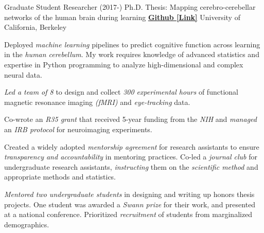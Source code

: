 

\begin{cventries}

  \cventry
    {Graduate Student Researcher (2017-)} %
    {Ph.D. Thesis: Mapping cerebro-cerebellar networks of the human brain during learning}
    {\href{https://github.com/maedbhk/cerebellum_learning_connect}{\textbf{Github [Link]}}}
    {University of California, Berkeley} %
    {
      \begin{cvitems} %
        \item {Deployed \textit{machine learning} pipelines to predict cognitive function across learning in the \textit{human cerebellum}. My work requires knowledge of advanced statistics and expertise in Python programming to analyze high-dimensional and complex neural data.} 
        \item {\textit{Led a team of 8} to design and collect \textit{300 experimental hours} of functional magnetic resonance imaging \textit{(fMRI)} and \textit{eye-tracking} data.}
        \item {Co-wrote an \textit{R35 grant} that received 5-year funding from the \textit{NIH} and \textit{managed} an \textit{IRB protocol} for neuroimaging experiments.}
        \item {Created a widely adopted \textit{mentorship agreement} for research assistants to ensure \textit{transparency and accountability} in mentoring practices. Co-led a \textit{journal club} for undergraduate research assistants, \textit{instructing} them on the \textit{scientific method} and appropriate methods and statistics.}
        \item {\textit{Mentored two undergraduate students} in designing and writing up honors thesis projects. One student was awarded a \textit{Swann prize} for their work, and presented at a national conference. Prioritized \textit{recruitment} of students from marginalized demographics.}
      \end{cvitems}
    }
    

\end{cventries}
